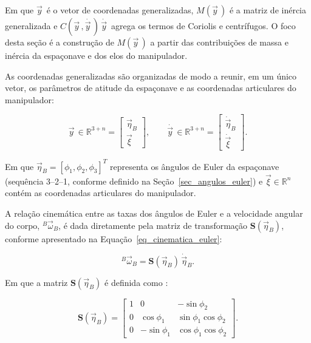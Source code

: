 Em que $\vec y\, $ é o vetor de coordenadas generalizadas, $M(\vec y\, )$ é a
matriz de inércia generalizada e $C(\vec y\, ,\dot{\vec y\, })\,\dot{\vec y\, }$
agrega os termos de Coriolis e centrífugos.
O foco desta seção é a construção de $M(\vec y\, )$ a partir das
contribuições de massa e inércia da espaçonave e dos elos do manipulador.

As coordenadas generalizadas são organizadas de modo a reunir, em um único
vetor, os parâmetros de atitude da espaçonave e as coordenadas articulares do
manipulador:

\begin{equation}
\vec y\, \in \mathbb{R}^{3+n}
=
\begin{bmatrix}
\vec\eta_B \\[2pt]
\vec\xi\end{bmatrix},
\qquad
\dot{\vec y\, } \in \mathbb{R}^{3+n}
=
\begin{bmatrix}
\dot{\vec\eta}_B \\[2pt]
\dot{\vec\xi}
\end{bmatrix}.
\label{eq_q_generalizado_espaconave_mr}
\end{equation}

Em que $\vec\eta_B = [\phi_1, \phi_2, \phi_3]^T$ representa os ângulos de Euler da
espaçonave (sequência 3--2--1, conforme definido na Seção~\ref{sec_angulos_euler}) e $\vec\xi \in \mathbb{R}^{n}$ contém as coordenadas articulares do manipulador.

A relação cinemática entre as taxas dos ângulos de Euler e a velocidade
angular do corpo, ${}^{B}\!\vec\omega_B$, é dada diretamente pela matriz de transformação $\mathbf{S}(\vec\eta_B)$, conforme apresentado na Equação~\eqref{eq_cinematica_euler}:

\begin{equation}
{}^{B}\!\vec\omega_B
=
\mathbf{S}(\vec\eta_B)\,\dot{\vec\eta}_B.
\label{eq:euler_direct_kinematics}
\end{equation}

Em que a matriz $\mathbf{S}(\vec\eta_B)$ é definida como \cite{wie2008space}:

\begin{equation}
\mathbf{S}(\vec\eta_B)
=
\begin{bmatrix}
1 & 0 & -\sin\phi_2 \\
0 & \cos\phi_1 & \sin\phi_1 \cos\phi_2 \\
0 & -\sin\phi_1 & \cos\phi_1 \cos\phi_2
\end{bmatrix}.
\label{eq:S_matrix_definition}
\end{equation}

